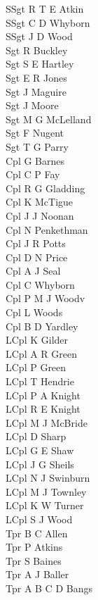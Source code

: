 \begin{multicols}{4}
  \scriptsize
  \noindent
  SSgt R T E Atkin \\
  SSgt C D Whyborn \\
  SSgt J D Wood \\
  Sgt R Buckley \\
  Sgt S E Hartley \\
  Sgt E R Jones \\
  Sgt J Maguire \\
  Sgt J Moore \\
  Sgt M G McLelland \\
  Sgt F Nugent \\
  Sgt T G Parry \\
  Cpl G Barnes \\
  Cpl C P Fay \\
  Cpl R G Gladding \\
  Cpl K McTigue \\
  Cpl J J Noonan \\
  Cpl N Penkethman \\
  Cpl J R Potts \\
  Cpl D N Price \\
  Cpl A J Seal \\
  Cpl C Whyborn \\
  Cpl P M J Woodv \\
  Cpl L Woods \\
  Cpl B D Yardley \\
  LCpl K Gilder \\
  LCpl A R Green \\
  LCpl P Green \\
  LCpl T Hendrie \\
  LCpl P A Knight \\
  LCpl R E Knight \\
  LCpl M J McBride \\
  LCpl D Sharp \\
  LCpl G E Shaw \\
  LCpl J G Sheils \\
  LCpl N J Swinburn \\
  LCpl M J Townley \\
  LCpl K W Turner \\
  LCpl S J Wood \\
  Tpr B C Allen \\
  Tpr P Atkins \\
  Tpr S Baines \\
  Tpr A J Baller \\
  Tpr A B C D Bangs \\

\end{multicols}
